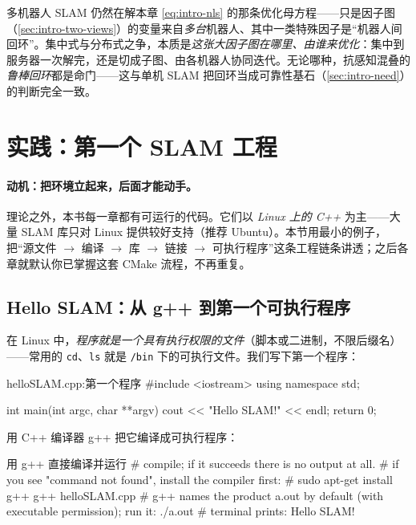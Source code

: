 \begin{insight}
多机器人 SLAM 仍然在解本章 \cref{eq:intro-nls} 的那条优化母方程——只是因子图（\cref{sec:intro-two-views}）的变量来自\emph{多台}机器人、其中一类特殊因子是“机器人间回环”。集中式与分布式之争，本质是\emph{这张大因子图在哪里、由谁来优化}：集中到服务器一次解完，还是切成子图、由各机器人协同迭代。无论哪种，抗感知混叠的\emph{鲁棒回环}都是命门——这与单机 SLAM 把回环当成可靠性基石（\cref{sec:intro-need}）的判断完全一致。
\end{insight}

\section{实践：第一个 SLAM 工程}
\label{sec:intro-code}

\paragraph{动机：把环境立起来，后面才能动手。}
理论之外，本书每一章都有可运行的代码。它们以 \emph{Linux 上的 C++} 为主——大量 SLAM 库只对 Linux 提供较好支持（推荐 Ubuntu）。本节用最小的例子，把“源文件 $\to$ 编译 $\to$ 库 $\to$ 链接 $\to$ 可执行程序”这条工程链条讲透；之后各章就默认你已掌握这套 CMake 流程，不再重复。

\subsection{Hello SLAM：从 g++ 到第一个可执行程序}
\label{sec:intro-hello}
在 Linux 中，\emph{程序就是一个具有执行权限的文件}（脚本或二进制，不限后缀名）——常用的 \texttt{cd}、\texttt{ls} 就是 \texttt{/bin} 下的可执行文件。我们写下第一个程序：

\begin{codebox}[C++]{helloSLAM.cpp:第一个程序}
#include <iostream>
using namespace std;

int main(int argc, char **argv) {
    cout << "Hello SLAM!" << endl;
    return 0;
}
\end{codebox}

\noindent 用 C++ 编译器 g++ 把它编译成可执行程序：

\begin{codebox}[bash]{用 g++ 直接编译并运行}
# compile; if it succeeds there is no output at all.
# if you see "command not found", install the compiler first:
#   sudo apt-get install g++
g++ helloSLAM.cpp
# g++ names the product a.out by default (with executable permission); run it:
./a.out
# terminal prints: Hello SLAM!
\end{codebox}

